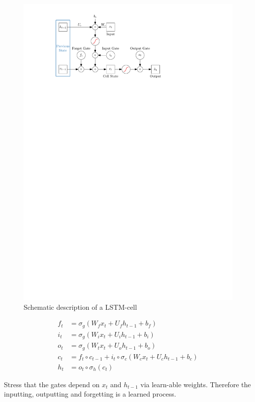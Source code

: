 \begin{figure}[t]
  \centering
  \includegraphics{./figures/theory/LSTM.pdf}
  \caption{Schematic description of a LSTM-cell}
  \label{fig:schematic_lstm}
\end{figure}

\begin{align}
  f_t &= \sigma_g( W_f x_t + U_f h_{t-1} + b_f) \\
  i_t &= \sigma_g( W_i x_t + U_i h_{t-1} + b_i) \\
  o_t &= \sigma_g( W_t x_t + U_o h_{t-1} + b_o) \\
  c_t &= f_t \circ c_{t-1} + i_t \circ \sigma_c(W_c x_t + U_c h_{t-1} + b_c) \\
  h_t &= o_t \circ \sigma_h(c_t)
\end{align}

Stress that the gates depend on $x_t$ and $h_{t-1}$ via learn-able weights.
Therefore the inputting, outputting and forgetting is a learned process.

